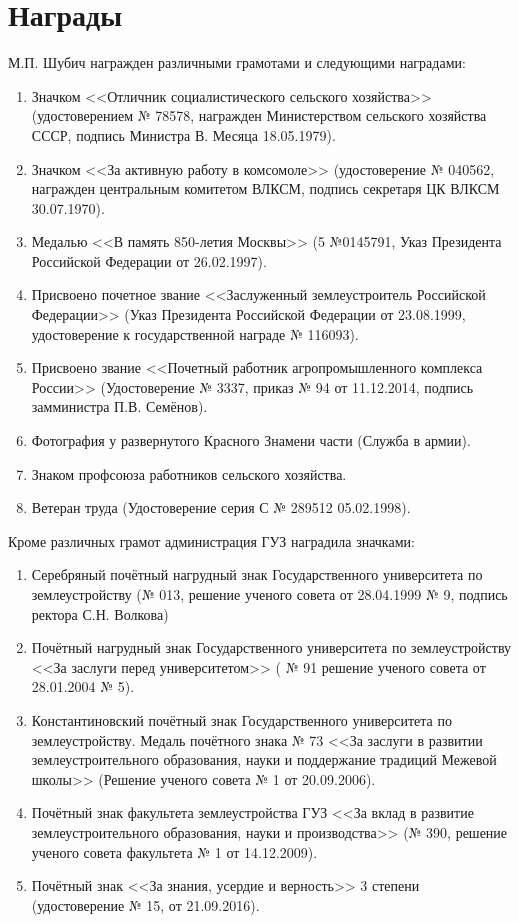 ﻿\section{Награды}
\noindent М.П. Шубич награжден различными грамотами и следующими наградами: 

\begin{enumerate}
	\item Значком <<Отличник социалистического сельского хозяйства>> (удостоверением № 78578, награжден Министерством сельского хозяйства СССР, подпись Министра В. Месяца 18.05.1979).
	\item Значком <<За активную работу в комсомоле>> (удостоверение № 040562, награжден центральным комитетом ВЛКСМ, подпись секретаря ЦК ВЛКСМ 30.07.1970).
	\item Медалью <<В память 850-летия Москвы>> (5 №0145791, Указ Президента Российской Федерации от 26.02.1997).
	\item Присвоено почетное звание <<Заслуженный землеустроитель Российской Федерации>> (Указ Президента Российской Федерации от 23.08.1999, удостоверение к государственной награде № 116093).
	\item Присвоено звание <<Почетный работник агропромышленного комплекса России>> (Удостоверение № 3337, приказ № 94 от 11.12.2014, подпись замминистра П.В. Семёнов).
	\item Фотография у развернутого Красного Знамени части (Служба в армии).
	\item Знаком профсоюза работников сельского хозяйства.
	\item Ветеран труда (Удостоверение серия С № 289512 05.02.1998).
\end{enumerate}

\noindent Кроме различных грамот администрация ГУЗ наградила значками:
\begin{enumerate}	
	\item Серебряный почётный нагрудный знак Государственного университета по землеустройству (№ 013, решение ученого совета от 28.04.1999 № 9, подпись ректора С.Н. Волкова) 
	\item Почётный нагрудный знак Государственного университета по землеустройству <<За заслуги перед университетом>> ( № 91 решение ученого совета от 28.01.2004 № 5).
	\item Константиновский почётный знак Государственного университета по землеустройству. Медаль почётного знака № 73 <<За заслуги в развитии землеустроительного образования, науки и поддержание традиций Межевой школы>> (Решение ученого совета № 1 от 20.09.2006).
	\item Почётный знак факультета землеустройства ГУЗ <<За вклад в развитие землеустроительного образования, науки и производства>> (№ 390, решение ученого совета факультета № 1 от 14.12.2009).
	\item Почётный знак <<За знания, усердие и верность>> 3 степени (удостоверение № 15, от 21.09.2016). 
\end{enumerate}
